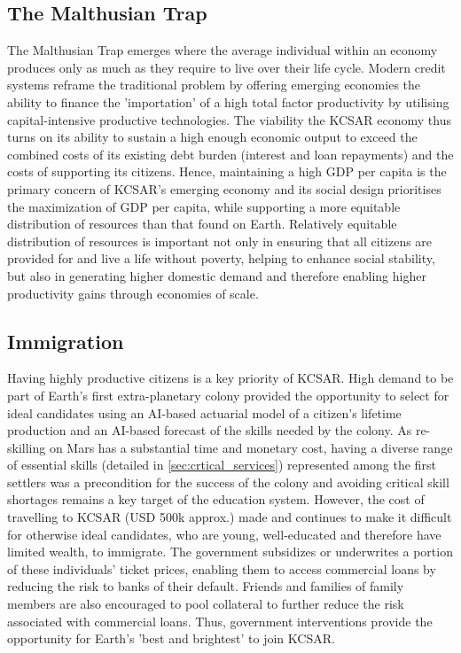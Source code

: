 \documentclass[fleqn,10pt]{Stylesheet} %
\begin{document}
\subsection{The Malthusian Trap}
The Malthusian Trap emerges where the average individual within an economy produces only as much as they require to live over their life cycle. Modern credit systems reframe the traditional problem by offering emerging economies the ability to finance the 'importation' of a high total factor productivity by utilising capital-intensive productive technologies. The viability the KCSAR economy thus turns on its ability to sustain a high enough economic output to exceed the combined costs of its existing debt burden (interest and loan repayments) and the costs of supporting its citizens. Hence, maintaining a high GDP per capita is the primary concern of KCSAR's emerging economy and its social design prioritises the maximization of GDP per capita, while supporting a more equitable distribution of resources than that found on Earth. Relatively equitable distribution of resources is important not only in ensuring that all citizens are provided for and live a life without poverty, helping to enhance social stability, but also in generating higher domestic demand and therefore enabling higher productivity gains through economies of scale. \cite{Kogel} 

\subsection{Immigration}
\label{sec:immigration}
Having highly productive citizens is a key priority of KCSAR. High demand to be part of Earth's first extra-planetary colony provided the opportunity to select for ideal candidates using an AI-based actuarial model of a citizen's lifetime production and an AI-based forecast of the skills needed by the colony. As re-skilling on Mars has a substantial time and monetary cost, having a diverse range of essential skills (detailed in \ref{sec:crtical_services}) represented among the first settlers was a precondition for the success of the colony and avoiding critical skill shortages remains a key target of the education system. However, the cost of travelling to KCSAR (USD 500k approx.) made and continues to make it difficult for otherwise ideal candidates, who are young, well-educated and therefore have limited wealth, to immigrate. The government subsidizes or underwrites a portion of these individuals' ticket prices, enabling them to access commercial loans by reducing the risk to banks of their default. Friends and families of family members are also encouraged to pool collateral to further reduce the risk associated with commercial loans. Thus, government interventions provide the opportunity for Earth's 'best and brightest' to join KCSAR.
\end{document}

